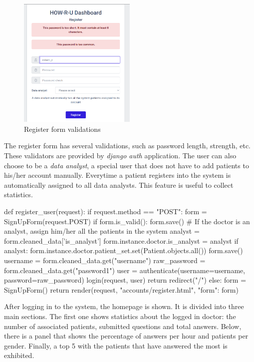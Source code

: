 \documentclass[12pt,english]{article}
\begin{document}
\begin{figure}[H]
    \centering
    \includegraphics[width=0.5\textwidth]{register_error.png}
    \caption{Register form validations}
\end{figure}

The register form has several validations, such as password length, strength, etc. These validators are provided by \emph{django auth} application. The user can also choose to be a \emph{data analyst}, a special user that does not have to add patients to his/her account manually. Everytime a patient registers into the system is automatically assigned to all data analysts. This feature is useful to collect statistics.

\begin{python}[caption={Method to register an user in the system}, captionpos=b]
  def register_user(request):
    if request.method == "POST":
        form = SignUpForm(request.POST)
        if form.is_valid():
            form.save()
            # If the doctor is an analyst, assign him/her all the patients in the system
            analyst = form.cleaned_data['is_analyst']
            form.instance.doctor.is_analyst = analyst
            if analyst:
                form.instance.doctor.patient_set.set(Patient.objects.all())
            form.save()
            username = form.cleaned_data.get("username")
            raw_password = form.cleaned_data.get("password1")
            user = authenticate(username=username, password=raw_password)
            login(request, user)
            return redirect("/")
    else:
        form = SignUpForm()
    return render(request, "accounts/register.html", {"form": form})
\end{python}

After logging in to the system, the homepage is shown. It is divided into three main sections. The first one shows statistics about the logged in doctor: the number of associated patients, submitted questions and total answers. Below, there is a panel that shows the percentage of answers per hour and patients per gender. Finally, a top 5 with the patients that have answered the most is exhibited.
\end{document}
